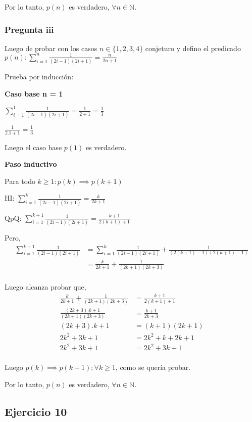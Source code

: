 Por lo tanto, $p(n)$ es verdadero, $\forall n \in \mathbb{N}$.

\subsubsection{Pregunta iii}

Luego de probar con los casos $n \in \{ 1,2,3,4 \}$ conjeturo y defino el predicado $p(n): \sum_{i=1}^{n}\frac{1}{(2i-1)(2i+1)} = \frac{n}{2n+1}$

Prueba por inducción:

\textbf{Caso base n = 1}

$ \sum_{i=1}^{1}\frac{1}{(2i-1)(2i+1)} = \frac{1}{2+1} = \frac{1}{3}$

$ \frac{1}{2.1+1} = \frac{1}{3}$

Luego el caso base $p(1)$ es verdadero.

\textbf{Paso inductivo}

Para todo $k \geq 1: p(k) \implies p(k+1)$

HI: $\sum_{i=1}^{k}\frac{1}{(2i-1)(2i+1)} = \frac{k}{2k+1}$

QpQ: $\sum_{i=1}^{k+1}\frac{1}{(2i-1)(2i+1)} = \frac{k+1}{2(k+1)+1}$

Pero,
\begin{align*}
    \sum_{i=1}^{k+1}\frac{1}{(2i-1)(2i+1)} &= \sum_{i=1}^{k}\frac{1}{(2i-1)(2i+1)} + \frac{1}{(2(k+1)-1)(2(k+1)-1)} \\
    &= \frac{k}{2k+1} + \frac{1}{(2k+1)(2k+3)} \\
\end{align*}

Luego alcanza probar que,
\begin{align*}
    \frac{k}{2k+1} + \frac{1}{(2k+1)(2k+3)} &= \frac{k+1}{2(k+1)+1} \\
    \frac{(2k+3).k + 1}{(2k+1)(2k+3)} &= \frac{k+1}{2k+3} \\
    (2k+3).k + 1 &= (k+1)(2k+1) \\
    2k^2 + 3k + 1 &= 2k^2 + k + 2k +1 \\
    2k^2 + 3k + 1 &= 2k^2 + 3k +1 \\
\end{align*}

Luego $p(k) \implies p(k+1); \forall k \geq 1$, como se quería probar.

Por lo tanto, $p(n)$ es verdadero, $\forall n \in \mathbb{N}$.

\subsection{Ejercicio 10}


